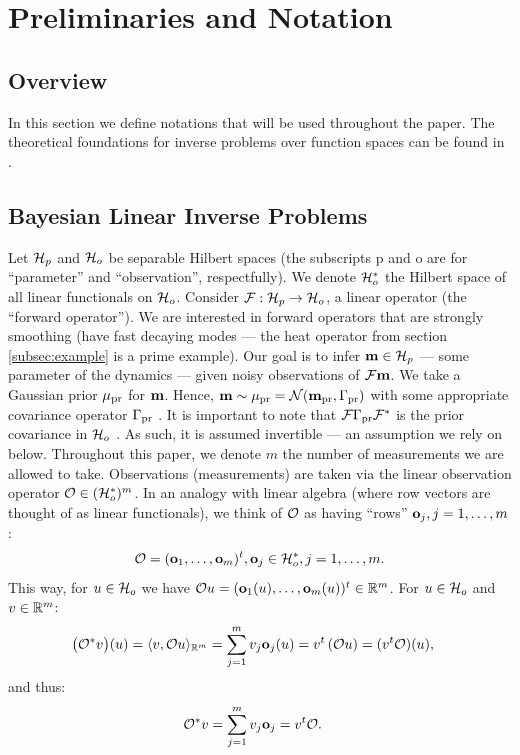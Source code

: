 \documentclass{amsart}
\numberwithin{equation}{section}
\begin{document}
\section{Preliminaries and Notation}\label{section:prelim}

\subsection{Overview}
In this section we define notations that will be used throughout the
paper. The theoretical foundations for inverse problems over function spaces
can be found in \cite{Stuart10}.


\subsection{Bayesian Linear Inverse Problems}\label{subsec:abstract OED}
Let $\mathcal{H}_p$ and $\mathcal{H}_o$ be separable Hilbert spaces (the subscripts p
and o are for ``parameter'' and ``observation'', respectfully). We
denote $\mathcal{H}_o^*$ the Hilbert space of all linear functionals on
$\mathcal{H}_o$. Consider $\mathcal{F}: \mathcal{H}_p \to \mathcal{H}_o$, a linear operator (the
``forward operator''). We are interested in forward operators that are
strongly smoothing (have fast decaying modes --- the heat operator
from section \ref{subsec:example} is a prime example). Our goal is to
infer $\mathbf{m} \in \mathcal{H}_p$ --- some parameter of the dynamics --- given
noisy observations of $\mathcal{F} \mathbf{m}$. We take a Gaussian prior $\mu_{\textup{pr}}$
for $\mathbf{m}$. Hence, $\mathbf{m} \sim \mu_{\textup{pr}} = \mathcal{N}(\mathbf{m}_{\textup{pr}} ,\Gamma_{\textup{pr}})$
with some appropriate covariance operator $\Gamma_{\textup{pr}}$ \cite{Stuart10}. It
is important to note that $\mathcal{F} \Gamma_{\textup{pr}} \mathcal{F}^*$ is the prior covariance
in $\mathcal{H}_o$ \cite{Stuart10}. As such, it is assumed invertible --- an
assumption we rely on below. Throughout this paper, we denote $m$ the
number of measurements we are allowed to take. Observations
(measurements) are taken via the linear observation operator $\mathcal{O} \in
( \mathcal{H}_o^* )^m$. In an analogy with linear algebra (where row vectors
are thought of as linear functionals), we think of $\mathcal{O}$ as having
``rows'' $\mathbf{o}_j, j=1,\dots,m$:
\begin{equation}\label{eq:O}
  \mathcal{O} = (\mathbf{o}_1,\dots, \mathbf{o}_m)^t, \mathbf{o}_j \in \mathcal{H}_o^*, j = 1,\dots,m.
\end{equation}
This way, for $u \in \mathcal{H}_o$ we have $\mathcal{O} u = (\mathbf{o}_1(u), \dots,
\mathbf{o}_m(u) )^t \in \mathbb{R}^m$.
For $u \in \mathcal{H}_o$ and $v\in \mathbb{R}^m$:
\begin{align*}
  \big (\mathcal{O}^*v \big ) (u) &= \langle v, \mathcal{O} u \rangle_{\mathbb{R}^m} = \sum_{j=1}^m  v_j \mathbf{o}_j(u)
  = v^t \left ( \mathcal{O} u \right ) = (v^t \mathcal{O}) (u),
\end{align*}
and thus:
\begin{align}\label{eq:obs*}
  \mathcal{O}^*v &= \sum_{j=1}^m v_j \mathbf{o}_j = v^t \mathcal{O}.
\end{align}
\end{document}
